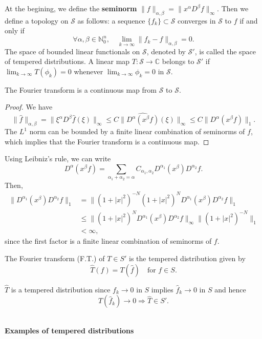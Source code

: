 At the begining, we define the \textbf{seminorm} $\|f\|_{\alpha, \beta}=\|x^\alpha D^\beta f\|_{\infty}$. Then we define a topology on $\mathcal{S}$ as follows: a sequence $\{f_k\} \subset \mathcal{S}$ converges in $\mathcal{S}$ to $f$ if and only if
$$
\forall \alpha, \beta \in \mathbb{N}_0^n, \quad \lim_{k \rightarrow \infty} \|f_k - f\|_{\alpha, \beta} = 0.
$$
The space of bounded linear functionals on $\mathcal{S}$, denoted by $\mathcal{S}'$, is called the space of tempered distributions. A linear map $T: \mathcal{S} \rightarrow \mathbb{C}$ belongs to $\mathcal{S}'$ if $\lim_{k \rightarrow \infty} T(\phi_k) = 0$ whenever $\lim_{k \rightarrow \infty} \phi_k = 0$ in $\mathcal{S}$.
\begin{theorem}
    The Fourier transform is a continuous map from $\mathcal{S}$ to $\mathcal{S}$.
\end{theorem}
\begin{proof}
    We have
$$
\|\hat{f}\|_{\alpha, \beta} = \|\xi^\alpha D^\beta \hat{f}(\xi)\|_{\infty} \leq C\|\widehat{D^\alpha(x^\beta f)}(\xi)\|_{\infty} \leq C\|D^\alpha(x^\beta f)\|_1.
$$
The $L^1$ norm can be bounded by a finite linear combination of seminorms of $f$, which implies that the Fourier transform is a continuous map.
\end{proof}
\begin{rmk}
    Using Leibniz's rule, we can write
$$
D^\alpha(x^\beta f) = \sum_{\alpha_1 + \alpha_2 = \alpha} C_{\alpha_1, \alpha_2} D^{\alpha_1}(x^\beta) D^{\alpha_2}f.
$$
Then,
$$
\begin{aligned}
\|D^{\alpha_1}(x^\beta) D^{\alpha_2}f\|_1 &= \|(1 + |x|^2)^{-N}(1 + |x|^2)^N D^{\alpha_1}(x^\beta) D^{\alpha_2}f\|_1 \\
&\leq \|(1 + |x|^2)^N D^{\alpha_1}(x^\beta) D^{\alpha_2}f\|_{\infty} \|(1 + |x|^2)^{-N}\|_1 \\
&< \infty,
\end{aligned}
$$
since the first factor is a finite linear combination of seminorms of $f$.
\end{rmk}
\begin{definition}
    The Fourier transform (F.T.) of $T \in S'$ is the tempered distribution given by
    $$
\hat{T}(f) = T(\hat{f}) \quad \text{for } f \in S.
$$
\end{definition}
\begin{rmk}
    $\hat{T}$ is a tempered distribution since $f_k \rightarrow 0$ in $S$ implies $\hat{f}_k \rightarrow 0$ in $S$ and hence
$$
T(\hat{f}_k) \rightarrow 0 \Rightarrow \hat{T} \in S'.
$$
\end{rmk}
~\\
\textbf{\large{Examples of tempered distributions}}

